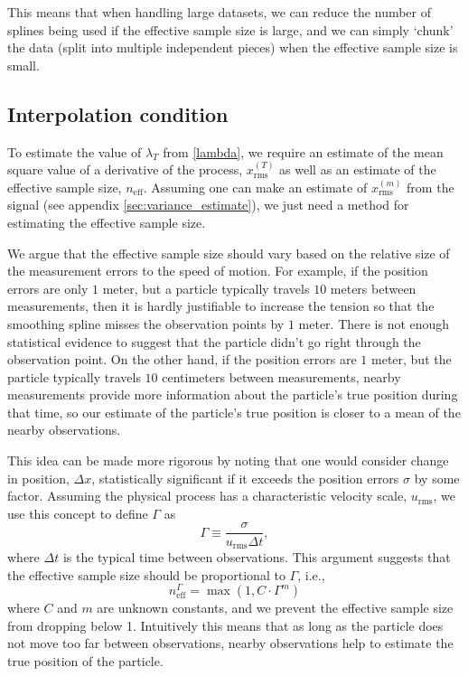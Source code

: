 \documentclass{ametsoc}
\begin{document}
This means that when handling large datasets, we can reduce the number of splines being used if the effective sample size is large, and we can simply `chunk' the data (split into multiple independent pieces) when the effective sample size is small.

\subsection{Interpolation condition} \label{interpolation_condition}

To estimate the value of $\lambda_T$ from \eqref{lambda}, we require an estimate of the mean square value of a derivative of the process, $x_{\textrm{rms}}^{(T)}$ as well as an estimate of the effective sample size, $n_{\textrm{eff}}$. Assuming one can make an estimate of $x_{\textrm{rms}}^{(m)}$ from the signal (see appendix \ref{sec:variance_estimate}), we just need a method for estimating the effective sample size.

We argue that the effective sample size should vary based on the relative size of the measurement errors to the speed of motion. For example, if the position errors are only $1$ meter, but a particle typically travels $10$ meters between measurements, then it is hardly justifiable to increase the tension so that the smoothing spline misses the observation points by $1$ meter. There is not enough statistical evidence to suggest that the particle didn't go right through the observation point. On the other hand, if the position errors are $1$ meter, but the particle typically travels $10$ centimeters between measurements, nearby measurements provide more information about the particle's true position during that time, so our estimate of the particle's true position is closer to a mean of the nearby observations.

This idea can be made more rigorous by noting that one would consider change in position, $\Delta x$, statistically significant if it exceeds the position errors $\sigma$ by some factor.  Assuming the physical process has a characteristic velocity scale, $u_{\textrm{rms}}$, we use this concept to define $\Gamma$ as
\begin{equation}
\label{gamma_def}
\Gamma \equiv \frac{\sigma}{u_{\textrm{rms}}\Delta t},
\end{equation}
where $\Delta t$ is the typical time between observations. This argument suggests that the effective sample size should be proportional to $\Gamma$, i.e.,
\begin{equation}
\label{gamma_equation}
n_{\textrm{eff}}^\Gamma = \max\left(1,C \cdot \Gamma^m\right)
\end{equation}
where $C$ and $m$ are unknown constants, and we prevent the effective sample size from dropping below 1. Intuitively this means that as long as the particle does not move too far between observations, nearby observations help to estimate the true position of the particle.
\end{document}
